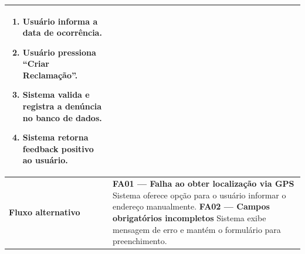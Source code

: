\begin{longtable}{|p{4cm}|p{10cm}|}
\begin{enumerate}
      \item Usuário informa a data de ocorrência.
      \item Usuário pressiona ``Criar Reclamação''.
      \item Sistema valida e registra a denúncia no banco de dados.
      \item Sistema retorna feedback positivo ao usuário.
    \end{enumerate} \\
  \hline
  \textbf{Fluxo alternativo} & \textbf{FA01 — Falha ao obter localização via GPS} \newline
    Sistema oferece opção para o usuário informar o endereço manualmente. \newline\newline
    \textbf{FA02 — Campos obrigatórios incompletos} \newline
    Sistema exibe mensagem de erro e mantém o formulário para preenchimento. \\
  \hline
\end{longtable}

